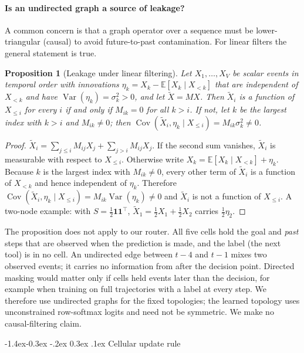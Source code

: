 \documentclass[10pt,twocolumn,letterpaper]{article}
\makeatletter
\renewcommand\subsection{\@startsection{subsection}{2}{\z@}%
  {-1.4ex\@plus -0.3ex \@minus -.2ex}%
  {0.3ex \@plus .1ex}%
  {\normalfont\normalsize\bfseries}}
\newtheorem{proposition}{Proposition}
\makeatother
\begin{document}
\paragraph{Is an undirected graph a source of leakage?} A common concern is that a graph operator over a sequence must be lower-triangular (causal) to avoid future-to-past contamination. For linear filters the general statement is true.
\begin{proposition}[Leakage under linear filtering]\label{prop:leakage}
Let $X_1,\dots,X_V$ be scalar events in temporal order with innovations $\eta_k = X_k - \mathbb{E}[X_k \mid X_{<k}]$ that are independent of $X_{<k}$ and have $\operatorname{Var}(\eta_k)=\sigma_k^2>0$, and let $\tilde X = MX$. Then $\tilde X_i$ is a function of $X_{\le i}$ for every $i$ if and only if $M_{ik}=0$ for all $k>i$. If not, let $k$ be the largest index with $k>i$ and $M_{ik}\ne0$; then $\operatorname{Cov}(\tilde X_i, \eta_k \mid X_{\le i}) = M_{ik}\sigma_k^2 \ne 0$.
\end{proposition}
\begin{proof}
$\tilde X_i = \sum_{j\le i} M_{ij}X_j + \sum_{j>i} M_{ij}X_j$. If the second sum vanishes, $\tilde X_i$ is measurable with respect to $X_{\le i}$. Otherwise write $X_k = \mathbb{E}[X_k\mid X_{<k}] + \eta_k$. Because $k$ is the largest index with $M_{ik}\neq 0$, every other term of $\tilde X_i$ is a function of $X_{<k}$ and hence independent of $\eta_k$. Therefore $\operatorname{Cov}(\tilde X_i,\eta_k\mid X_{\le i}) = M_{ik}\operatorname{Var}(\eta_k) \neq 0$ and $\tilde X_i$ is not a function of $X_{\le i}$. A two-node example: with $S = \tfrac12\mathbf{1}\mathbf{1}^\top$, $\tilde X_1 = \tfrac12 X_1 + \tfrac12 X_2$ carries $\tfrac12\eta_2$.
\end{proof}
The proposition does not apply to our router. All five cells hold the goal and \emph{past} steps that are observed when the prediction is made, and the label (the next tool) is in no cell. An undirected edge between $t{-}4$ and $t{-}1$ mixes two observed events; it carries no information from after the decision point. Directed masking would matter only if cells held events later than the decision, for example when training on full trajectories with a label at every step. We therefore use undirected graphs for the fixed topologies; the learned topology uses unconstrained row-softmax logits and need not be symmetric. We make no causal-filtering claim.

\subsection{Cellular update rule}\label{sec:update}
\end{document}
